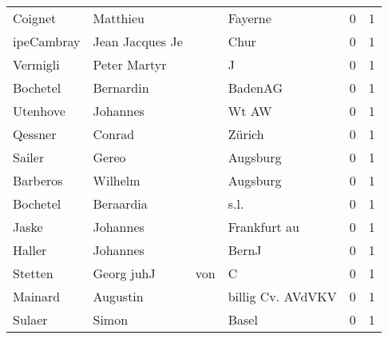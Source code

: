 \documentclass[10pt,a4paper,landscape]{article}
\begin{document}
\begin{longtable}{llllrr}
                  Coignet &                           Matthieu &             &                                     Fayerne &          0 &         1 \\
               ipeCambray &                    Jean Jacques Je &             &                                        Chur &          0 &         1 \\
                 Vermigli &                       Peter Martyr &             &                                           J &          0 &         1 \\
                 Bochetel &                          Bernardin &             &                                     BadenAG &          0 &         1 \\
                 Utenhove &                           Johannes &             &                                       Wt AW &          0 &         1 \\
                  Qessner &                             Conrad &             &                                      Zürich &          0 &         1 \\
                   Sailer &                              Gereo &             &                                    Augsburg &          0 &         1 \\
                 Barberos &                            Wilhelm &             &                                    Augsburg &          0 &         1 \\
                 Bochetel &                          Beraardia &             &                                        s.l. &          0 &         1 \\
                    Jaske &                           Johannes &             &                                Frankfurt au &          0 &         1 \\
                   Haller &                           Johannes &             &                                       BernJ &          0 &         1 \\
                  Stetten &                        Georg  juhJ &         von &                                           C &          0 &         1 \\
                  Mainard &                           Augustin &             &                           billig Cv. AVdVKV &          0 &         1 \\
                   Sulaer &                              Simon &             &                                       Basel &          0 &         1 \\

\end{longtable}
\end{document}
